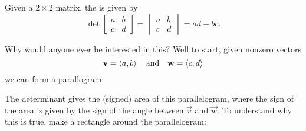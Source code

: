 \documentclass{ximera}
\begin{document}
\begin{definition}
  Given a $2\times2$ matrix, the  is given by
  \[
  \det
  \begin{bmatrix}
    a & b\\
    c & d
  \end{bmatrix}
  =
  \begin{vmatrix}
    a & b\\
    c & d
  \end{vmatrix}
  = ad -bc.
  \]
\end{definition}
Why would anyone ever be interested in this? Well to start, given nonzero vectors
\[
\mathbf{v} = \left\langle a,b\right\rangle\quad\text{and}\quad\mathbf{w}=\left\langle c,d\right\rangle
\]
we can form a parallogram:
\begin{image}
\end{image}
The determinant gives the (signed) area of this parallelogram, where
the sign of the area is given by the sign of the angle between
$\vec{v}$ and $\vec{w}$. To understand why this is true, make a
rectangle around the parallelogram:
\end{document}
